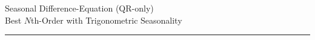\documentclass[11pt]{article}
\begin{document}
\begin{center}
  {\Large Seasonal Difference-Equation (QR-only)}\\[0.25em]
  {\normalsize Best $N$th-Order with Trigonometric Seasonality}\\[0.25em]
  \rule{0.9\linewidth}{0.4pt}
\end{center}

\end{document}
